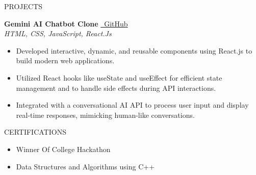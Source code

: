 \documentclass{shivam_resume} %
\begin{document}
\begin{rSection}{PROJECTS}

\textbf{Gemini AI Chatbot Clone} \hfill \href{https://github.com/Shivam-Kag/Gemini-Clone}{\faGithub\ GitHub} \\
\textit{HTML, CSS, JavaScript, React.Js}
\begin{itemize}
\itemsep -3pt
\small
\item Developed interactive, dynamic, and reusable components using React.js to build modern web applications.
\item Utilized React hooks like useState and useEffect for efficient state management and to handle side effects during API interactions.
\item Integrated with a conversational AI API to process user input and display real-time responses, mimicking human-like conversations.
\end{itemize}

\end{rSection}

\begin{rSection}{CERTIFICATIONS}
\begin{itemize}
\itemsep -4pt
\small
\item Winner Of College Hackathon
\item Data Structures and Algorithms using C++
\end{itemize}
\end{rSection}
\end{document}
